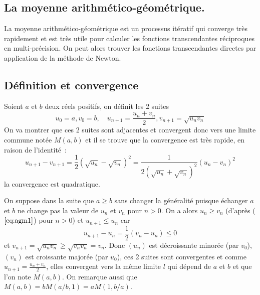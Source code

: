 \documentclass[a4paper,11pt]{book}
\begin{document}
\begin{giacjshere}
\chapter{La moyenne arithm\'etico-g\'eom\'etrique.}
\label{sec:agm}
La moyenne arithm\'etico-g\'eom\'etrique est un processus it\'eratif
qui converge tr\`es rapidement et est tr\`es utile pour calculer
les fonctions transcendantes r\'eciproques en multi-pr\'ecision. 
On peut alors trouver les fonctions transcendantes directes
par application de la m\'ethode de Newton.

\section{D\'efinition et convergence}
Soient $a$ et $b$ deux r\'eels positifs,
on d\'efinit les 2 suites 
\begin{equation} \label{eq:agm}
 u_0=a, v_0=b, \quad u_{n+1}=\frac{u_n+v_n}{2}, v_{n+1}=\sqrt{u_nv_n} 
\end{equation}
On va montrer que ces 2 suites sont adjacentes et convergent donc vers
une limite commune not\'ee $M(a,b)$ et il se trouve que la convergence
est tr\`es rapide, en raison de l'identit\'e~:
\begin{equation} \label{eq:agm1}
u_{n+1}-v_{n+1}=\frac{1}{2}(\sqrt{u_n}-\sqrt{v_n})^2
=\frac{1}{2(\sqrt{u_n}+\sqrt{v_n})^2}(u_n-v_n)^2
\end{equation}
la convergence est quadratique.

On suppose dans la suite que $a\geq b$ sans changer la généralité puisque échanger $a$ et $b$
ne change pas la valeur de $u_n$ et $v_n$ pour $n>0$. On a alors $u_n \geq v_n$ 
(d'après (\(\ref{eq:agm1}\)) pour $n>0$) et $u_{n+1} \leq u_n$ car
\[ u_{n+1}-u_n=\frac{1}{2}(v_n-u_{n}) \leq 0\]
et $v_{n+1}=\sqrt{u_nv_n} \geq \sqrt{v_nv_n}=v_n$. Donc $(u_n)$ est décroissante 
minorée (par $v_0$), $(v_n)$ est croissante majorée (par $u_0$), ces 2 suites sont 
convergentes et comme $u_{n+1}=\frac{u_n+v_n}{2}$, elles convergent vers la même limite 
$l$ qui d\'epend de $a$ et $b$ et que l'on note $M(a,b)$.
On remarque aussi que $M(a,b)=bM(a/b,1)=aM(1,b/a)$. 


\end{giacjshere}
\end{document}
